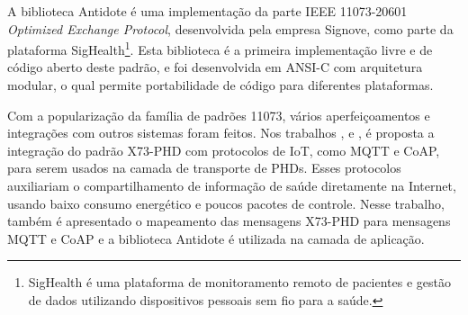 A biblioteca Antidote é uma implementação da parte IEEE 11073-20601 \textit{Optimized Exchange Protocol}, desenvolvida pela empresa Signove, como parte da plataforma SigHealth\footnote{SigHealth é uma plataforma de monitoramento remoto de pacientes e gestão de dados utilizando dispositivos pessoais sem fio para a saúde.}. Esta biblioteca é a primeira implementação livre e de código aberto deste padrão, e foi desenvolvida em ANSI-C com arquitetura modular, o qual permite portabilidade de código para diferentes plataformas.

Com a popularização da família de padrões 11073, vários aperfeiçoamentos e integrações com outros sistemas foram feitos. Nos trabalhos \cite{b7}, \cite{b8} e \cite{b9}, é proposta a integração do padrão X73-PHD com protocolos de IoT, como MQTT e CoAP, para serem usados na camada de transporte de PHDs. Esses protocolos auxiliariam o compartilhamento de informação de saúde diretamente na Internet, usando baixo consumo energético e poucos pacotes de controle. Nesse trabalho, também é apresentado o mapeamento das mensagens X73-PHD para mensagens MQTT e CoAP e a biblioteca Antidote é utilizada na camada de aplicação.   

